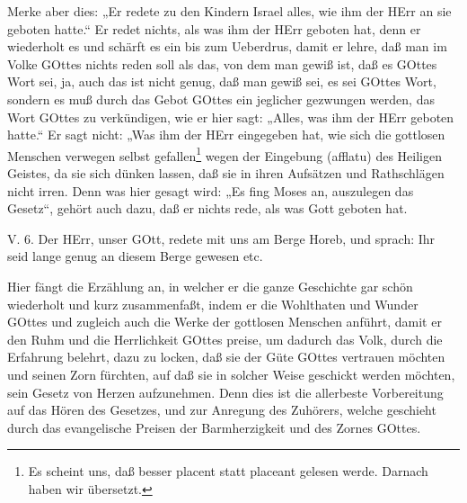 Merke aber dies: „Er redete zu den Kindern Israel alles, wie ihm der HErr an sie geboten hatte.“ Er redet nichts, als was ihm der HErr geboten hat, denn er wiederholt es und schärft es ein bis zum Ueberdrus, damit er lehre, daß man im Volke GOttes nichts reden soll als das, von dem man gewiß ist, daß es GOttes Wort sei, ja, auch das ist nicht genug, daß man gewiß sei, es sei GOttes Wort, sondern es muß durch das Gebot GOttes ein jeglicher gezwungen werden, das Wort GOttes zu verkündigen, wie er hier sagt: „Alles, was ihm der HErr geboten hatte.“ Er sagt nicht: „Was ihm der HErr eingegeben hat, wie sich die gottlosen Menschen verwegen selbst gefallen\footnote{Es scheint uns, daß besser placent statt placeant gelesen werde. Darnach haben wir übersetzt.} wegen der Eingebung (afflatu) des Heiligen Geistes, da sie sich dünken lassen, daß sie in ihren Aufsätzen und Rathschlägen nicht irren. Denn was hier gesagt wird: „Es fing Moses an, auszulegen das Gesetz“, gehört auch dazu, daß er nichts rede, als was Gott geboten hat.

\begin{schriftzitat}
V. 6. Der HErr, unser GOtt, redete mit uns am Berge Horeb, und sprach: Ihr seid lange genug an diesem Berge gewesen etc.
\end{schriftzitat}

Hier fängt die Erzählung an, in welcher er die ganze Geschichte gar schön wiederholt und kurz zusammenfaßt, indem er die Wohlthaten und Wunder GOttes und zugleich auch die Werke der gottlosen Menschen anführt, damit er den Ruhm und die Herrlichkeit GOttes preise, um dadurch das Volk, durch die Erfahrung belehrt, dazu zu locken, daß sie der Güte GOttes vertrauen möchten und seinen Zorn fürchten, auf daß sie in solcher Weise geschickt werden möchten, sein Gesetz von Herzen aufzunehmen. Denn dies ist die allerbeste Vorbereitung auf das Hören des Gesetzes, und zur Anregung des Zuhörers, welche geschieht durch das evangelische Preisen der Barmherzigkeit und des Zornes GOttes.

